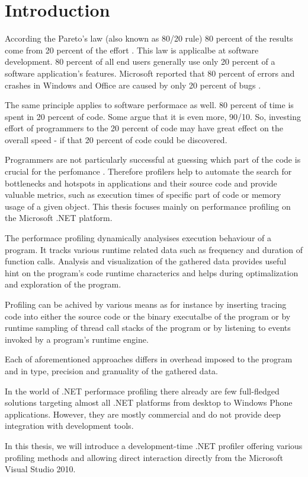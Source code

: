 \chapter{Introduction}

According the Pareto's law (also known as 80/20 rule) 80 percent of the results come from 20 percent of the effort \cite{RicKoch1999}. This law is applicalbe at software development. 80 percent of all end users generally use only 20 percent of a software application's features. Microsoft reported that 80 percent of errors and crashes in Windows and Office are caused by only 20 percent of bugs \cite{PauRoon2002}.

The same principle applies to software performace as well. 80 percent of time is spent in 20 percent of code. Some argue that it is even more, 90/10. So, investing effort of programmers to the 20 percent of code may have great effect on the overall speed - if that 20 percent of code could be discovered.

Programmers are not particularly successful at guessing which part of the code is crucial for the perfomance \cite{SteMcCo2004}. Therefore profilers help to automate the search for bottlenecks and hotspots in applications and their source code and provide valuable metrics, such as execution times of specific part of code or memory usage of a given object. This thesis focuses mainly on performance profiling on the Microsoft .NET platform.

The performace profiling dynamically analysises execution behaviour of a program. It tracks various runtime related data such as frequency and duration of function calls. Analysis and visualization of the gathered data provides useful hint on the program's code runtime characterics and helps during optimalization and exploration of the program.
	
Profiling can be achived by various means as for instance by inserting tracing code into either the source code or the binary executalbe of the program or by runtime sampling of thread call stacks of the program or by listening to events invoked by a program's runtime engine.

Each of aforementioned approaches differs in overhead imposed to the program and in type, precision and granuality of the gathered data.

In the world of .NET performace profiling there already are few full-fledged solutions targeting almost all .NET platforms from desktop to Windows Phone applications. However, they are mostly commercial and do not provide deep integration with development tools.  

In this thesis, we will introduce a development-time .NET profiler offering various profiling methods and allowing direct interaction directly from the Microsoft Visual Studio 2010.